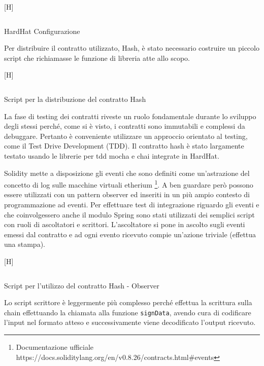 \documentclass[a4paper,11pt]{article}
\newenvironment{longlisting}{\captionsetup{type=figure,labelformat=custom}}{}
\begin{document}
\begin{longlisting}[H]
  \inputminted{typescript}{./code/hardhat.config.ts}
  \caption{HardHat Configurazione}
  \label{listing:hardhatconf}
\end{longlisting}

Per distribuire il contratto utilizzato, Hash, è stato necessario costruire un piccolo script che richiamasse le funzione di libreria atte allo scopo.

\begin{longlisting}[H]
  \inputminted{typescript}{./code/hash.deploy.ts}
  \caption{Script per la distribuzione del contratto Hash}
  \label{listing:hash4}
\end{longlisting}

La fase di testing dei contratti riveste un ruolo fondamentale durante lo sviluppo degli stessi perché, come si è visto, i contratti sono immutabili e complessi da debuggare. Pertanto è conveniente utilizzare un approccio orientato al testing, come il Test Drive Development (TDD). Il contratto hash è stato largamente testato usando le librerie per tdd mocha e chai integrate in HardHat.


Solidity mette a disposizione gli eventi che sono definiti come un'astrazione del concetto di log sulle macchine virtuali etherium \footnote{Documentazione ufficiale https://docs.soliditylang.org/en/v0.8.26/contracts.html\#events}. A ben guardare però possono essere utilizzati con un pattern observer ed inseriti in un più ampio contesto di programmazione ad eventi. Per effettuare test di integrazione riguardo gli eventi e che coinvolgessero anche il modulo Spring sono stati utilizzati dei semplici script con ruoli di ascoltatori e scrittori. L'ascoltatore si pone in ascolto sugli eventi emessi dal contratto e ad ogni evento ricevuto compie un'azione triviale (effettua una stampa).

\begin{longlisting}[H]
  \inputminted{typescript}{./code/hash.listener.ts}
  \caption{Script per l'utilizzo del contratto Hash - Observer}
  \label{listing:hash5}
\end{longlisting}

Lo script scrittore è leggermente più complesso perché effettua la scrittura sulla chain effettuando la chiamata alla funzione \texttt{signData}, avendo cura di codificare l'input nel formato atteso e successivamente viene decodificato l'output ricevuto.
\end{document}
